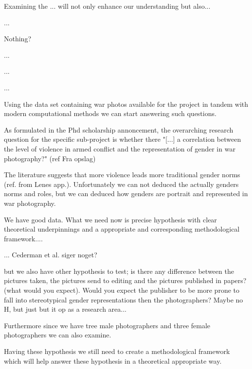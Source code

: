 \documentclass[a4paper]{article}
\begin{document}


Examining the ... will not only enhance our understanding but also...

...

Nothing?

...

...

...

Using the data set containing war photos available for the project in tandem with modern computational methods we can start answering such questions.

As formulated in the Phd scholarship annoncement, the overarching research question for the specific sub-project is whether there
"[...] a correlation between the level of violence in armed conflict and the representation of gender in war photography?" (ref Fra opslag)

The literature suggests that more violence leads more traditional gender norms (ref. from Lenes app.). Unfortunately we can not deduced the actually genders norms and roles, but we can deduced how genders are portrait and represented in war photography.

We have good data. What we need now is precise hypothesis with clear theoretical underpinnings and a appropriate and corresponding methodological framework....

... Cederman et al. siger noget?

but we also have other hypothesis to test; is there any difference between the pictures taken, the pictures send to editing and the pictures published in papers? (what would you expect). Would you expect the publisher to be more prone to fall into stereotypical gender representations then the photographers? Maybe no H, but just but it op as a research area...

Furthermore since we have tree male photographers and three female photographers we can also examine. 

Having these hypothesis we still need to create a methodological framework which will help answer these hypothesis in a theoretical appropriate way.
\end{document}

